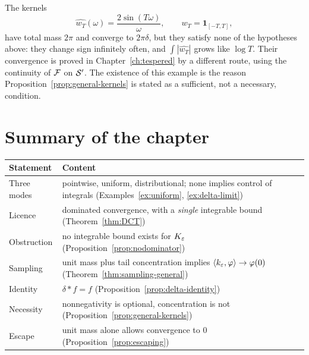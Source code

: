 \begin{remark}
The kernels
\begin{equation}
\widehat{w_{T}}(\omega)=\frac{2\sin(T\omega)}{\omega},
\qquad w_{T}=\mathbf{1}_{[-T,T]},
\end{equation}
have total mass $2\pi$ and converge to $2\pi\delta$, but they satisfy none of the hypotheses above:
they change sign infinitely often, and $\int|\widehat{w_{T}}|$ grows like $\log T$. Their convergence
is proved in Chapter~\ref{ch:tespered} by a different route, using the continuity of $\mathcal{F}$ on
$\mathcal{S}'$. The existence of this example is the reason Proposition~\ref{prop:general-kernels} is stated
as a sufficient, not a necessary, condition.
\end{remark}

\section{Summary of the chapter}

\begin{center}
\small
\begin{tabular}{@{}p{3.2cm}p{9.6cm}@{}}
\toprule
Statement & Content \\
\midrule
Three modes & pointwise, uniform, distributional; none implies control of integrals
(Examples~\ref{ex:uniform}, \ref{ex:delta-limit}) \\
Licence & dominated convergence, with a \emph{single} integrable bound
(Theorem~\ref{thm:DCT}) \\
Obstruction & no integrable bound exists for $K_{\varepsilon}$
(Proposition~\ref{prop:nodominator}) \\
Sampling & unit mass plus tail concentration implies $\langle k_{\varepsilon},\varphi\rangle\to\varphi(0)$
(Theorem~\ref{thm:sampling-general}) \\
Identity & $\delta*f=f$ (Proposition~\ref{prop:delta-identity}) \\
Necessity & nonnegativity is optional, concentration is not
(Proposition~\ref{prop:general-kernels}) \\
Escape & unit mass alone allows convergence to $0$
(Proposition~\ref{prop:escaping}) \\
\bottomrule
\end{tabular}
\end{center}
